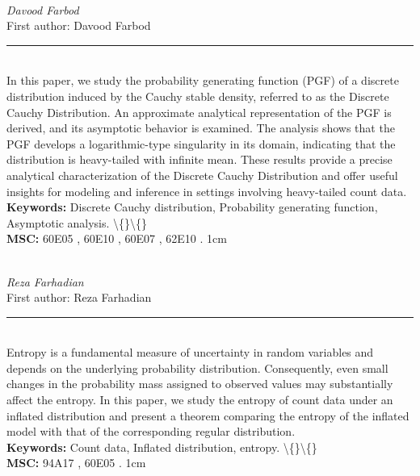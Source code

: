 \documentclass[10pt,twoside]{article}
\begin{document}
\noindent\begin{minipage}[t][\textheight]{\textwidth}
\\[0.35em]
{\itshape Davood Farbod}\\[0.2em]
{\footnotesize First author: Davood Farbod}\\[0.45em]
\noindent\rule{\textwidth}{0.3pt}\\[0.4em]
{\footnotesize  In this paper, we study the probability generating function (PGF) of a discrete distribution induced by the Cauchy stable density, referred to as the Discrete Cauchy Distribution. An approximate analytical representation of the PGF is derived, and its asymptotic behavior is examined. The analysis shows that the PGF develops a logarithmic-type singularity in its domain, indicating that the distribution is heavy-tailed with infinite mean. These results provide a precise analytical characterization of the Discrete Cauchy Distribution and offer useful insights for modeling and inference in settings involving heavy-tailed count data.}\\[0.4em]
{\footnotesize\bfseries Keywords:} {\footnotesize Discrete Cauchy distribution, Probability generating function, Asymptotic analysis. \textbackslash\{\}\textbackslash\{\}}\\[0.15em]
{\footnotesize\bfseries MSC:} {\footnotesize 60E05 , 60E10 , 60E07 , 62E10 . 1cm}\\
\vfill
\end{minipage}
\newpage

\noindent\begin{minipage}[t][\textheight]{\textwidth}
\\[0.35em]
{\itshape Reza Farhadian}\\[0.2em]
{\footnotesize First author: Reza Farhadian}\\[0.45em]
\noindent\rule{\textwidth}{0.3pt}\\[0.4em]
{\footnotesize  Entropy is a fundamental measure of uncertainty in random variables and depends on the underlying probability distribution. Consequently, even small changes in the probability mass assigned to observed values may substantially affect the entropy. In this paper, we study the entropy of count data under an inflated distribution and present a theorem comparing the entropy of the inflated model with that of the corresponding regular distribution.}\\[0.4em]
{\footnotesize\bfseries Keywords:} {\footnotesize Count data, Inflated distribution, entropy. \textbackslash\{\}\textbackslash\{\}}\\[0.15em]
{\footnotesize\bfseries MSC:} {\footnotesize 94A17 , 60E05 . 1cm}\\
\vfill
\end{minipage}
\newpage
\end{document}
